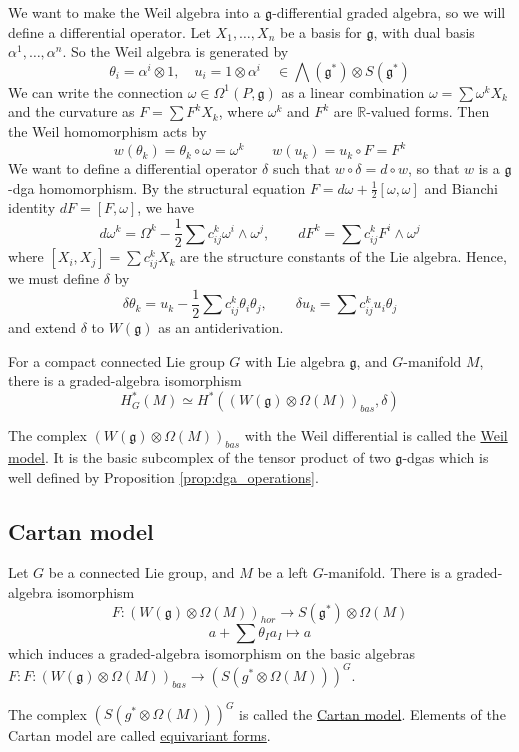 We want to make the Weil algebra into a $\mathfrak{g}$-differential graded
algebra, so we will define a differential operator. Let $X_1,\ldots,X_n$ be a basis
for $\mathfrak{g}$, with dual basis  $\alpha^1,\ldots,\alpha^n$. So the Weil
algebra is generated by 
\[
	 \theta_i = \alpha^i \otimes 1, \quad 
	 u_i = 1\otimes \alpha^i \quad\in \bigwedge(\mathfrak{g}^*)\otimes S(\mathfrak{g}^*)
\] 
We can write the connection $\omega\in\Omega^1(P,\mathfrak{g})$ as a linear
combination $\omega = \sum \omega^kX_k$ and the curvature as $F=\sum F^kX_k$,
where  $\omega^k$ and  $F^k$ are  $\mathbb{R}$-valued forms. 
Then the Weil homomorphism acts by 
\[
w(\theta_k) = \theta_k\circ \omega = \omega^k
\qquad 
w(u_k) = u_k\circ F = F^k
\] 
We want to define a differential operator $\delta$ such that  $w\circ \delta =
d\circ w$, so that $w$ is a  $\mathfrak{g}$-dga homomorphism. By the 
structural equation $F=d\omega + \frac{1}{2}[\omega,\omega]$ and 
Bianchi identity $dF=[F,\omega]$, we have
\[
d\omega^k = \Omega^k - \frac{1}{2}\sum c_{ij}^k \omega^i\wedge \omega^j,
\qquad 
dF^k = \sum c_{ij}^k F^i\wedge \omega^j
\] 
where $[X_i,X_j]=\sum c_{ij}^kX_k$ are the structure constants of the Lie
algebra. Hence, we must define $\delta$ by
\begin{equation}
\delta\theta_k = u_k - \frac{1}{2}\sum c_{ij}^k \theta_i\theta_j, \qquad
\delta u_k = \sum c_{ij}^k u_i\theta_j
\end{equation}
and extend $\delta$ to  $W(\mathfrak{g})$ as an antiderivation. 


\begin{thm} \label{thm:equivariant_de_Rham} %
	For a compact connected Lie group $G$ with Lie algebra $\mathfrak{g}$, and
	$G$-manifold  $M$, there is a graded-algebra isomorphism 
	 \[
		 H_G^*(M) \simeq H^*((W(\mathfrak{g})\otimes \Omega(M))_{bas}, \delta)
	\] 
\end{thm}
The complex $(W(\mathfrak{g})\otimes \Omega(M))_{bas}$ with the Weil
differential is called the \underline{Weil model}. It is the basic subcomplex of
the tensor product of two $\mathfrak{g}$-dgas which is well defined by
Proposition \ref{prop:dga_operations}.


\subsection{Cartan model}
\begin{thm} \label{thm:weil_cartan_iso} %
	Let $G$ be a connected Lie group, and $M$ be a left $G$-manifold. There is a
	graded-algebra isomorphism 
	\[
		F : (W(\mathfrak{g})\otimes \Omega(M))_{hor} \to S(\mathfrak{g}^*)\otimes \Omega(M)
	\] 
	\[
	a+ \sum \theta_I a_I \mapsto a
	\] 
	which induces a graded-algebra isomorphism on the basic algebras
	$F : F : (W(\mathfrak{g})\otimes \Omega(M))_{bas} \to (S(g^*\otimes
	\Omega(M)))^G$. 
\end{thm}
The complex $(S(g^*\otimes \Omega(M)))^G$ is called the \underline{Cartan
model}. Elements of the Cartan model are called \underline{equivariant forms}.

